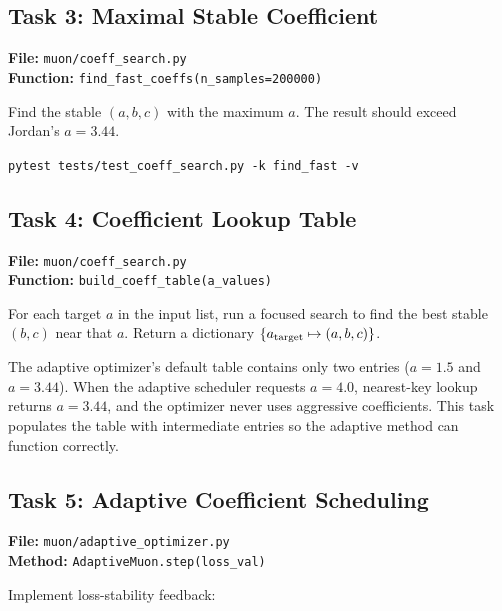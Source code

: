 \documentclass[11pt,a4paper]{article}
\begin{document}
\subsection*{Task 3: Maximal Stable Coefficient}

\textbf{File:} \texttt{muon/coeff\_search.py}\\[2pt]
\textbf{Function:} \texttt{find\_fast\_coeffs(n\_samples=200000)}

Find the stable $(a,b,c)$ with the maximum $a$.  The result should exceed Jordan's $a=3.44$.

\begin{mdframed}
\texttt{pytest tests/test\_coeff\_search.py -k find\_fast -v}
\end{mdframed}

\subsection*{Task 4: Coefficient Lookup Table}

\textbf{File:} \texttt{muon/coeff\_search.py}\\[2pt]
\textbf{Function:} \texttt{build\_coeff\_table(a\_values)}

For each target $a$ in the input list, run a focused search to find the best stable $(b,c)$ near that $a$.  Return a dictionary
$\{a_{\rm target} \mapsto (a,b,c)\}$.

The adaptive optimizer's default table contains only two entries
($a=1.5$ and $a=3.44$).  When the adaptive scheduler requests $a=4.0$,
nearest-key lookup returns $a=3.44$, and the optimizer never uses
aggressive coefficients.  This task populates the table with intermediate entries so the adaptive method can function correctly.

\subsection*{Task 5: Adaptive Coefficient Scheduling}

\textbf{File:} \texttt{muon/adaptive\_optimizer.py}\\[2pt]
\textbf{Method:} \texttt{AdaptiveMuon.step(loss\_val)}

Implement loss-stability feedback:
\end{document}

